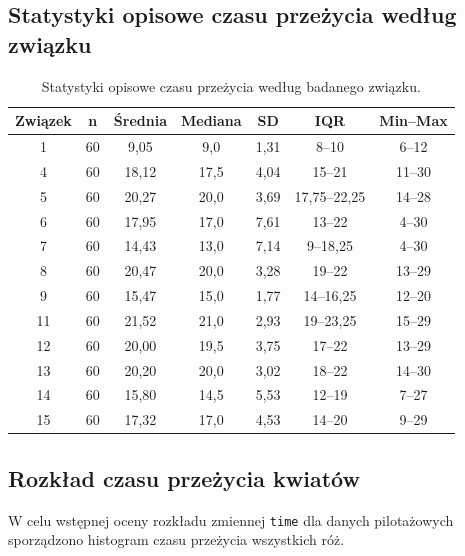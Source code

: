 \documentclass[12pt, a4paper]{article}
\begin{document}
\subsection{Statystyki opisowe czasu przeżycia według związku}\label{subsec:summary_compound}
\begin{table}[ht]
\centering
\caption{Statystyki opisowe czasu przeżycia według badanego związku.}
\label{tab:compound_summary}

\begin{tabular}{ccccccc}
\toprule
\textbf{Związek} & \textbf{n} & \textbf{Średnia} & \textbf{Mediana} &
\textbf{SD} & \textbf{IQR} & \textbf{Min--Max} \\
\midrule
1  & 60 &  9,05 &  9,0 & 1,31 & 8--10          & 6--12 \\
4  & 60 & 18,12 & 17,5 & 4,04 & 15--21         & 11--30 \\
5  & 60 & 20,27 & 20,0 & 3,69 & 17,75--22,25   & 14--28 \\
6  & 60 & 17,95 & 17,0 & 7,61 & 13--22         & 4--30 \\
7  & 60 & 14,43 & 13,0 & 7,14 & 9--18,25       & 4--30 \\
8  & 60 & 20,47 & 20,0 & 3,28 & 19--22         & 13--29 \\
9  & 60 & 15,47 & 15,0 & 1,77 & 14--16,25      & 12--20 \\
11 & 60 & 21,52 & 21,0 & 2,93 & 19--23,25      & 15--29 \\
12 & 60 & 20,00 & 19,5 & 3,75 & 17--22         & 13--29 \\
13 & 60 & 20,20 & 20,0 & 3,02 & 18--22         & 14--30 \\
14 & 60 & 15,80 & 14,5 & 5,53 & 12--19         & 7--27 \\
15 & 60 & 17,32 & 17,0 & 4,53 & 14--20         & 9--29 \\
\bottomrule
\end{tabular}

\end{table}

\subsection{Rozkład czasu przeżycia kwiatów}\label{subsec:survtime_distribution}
W celu wstępnej oceny rozkładu zmiennej \texttt{time} dla danych pilotażowych sporządzono histogram czasu przeżycia wszystkich róż. 
\end{document}
